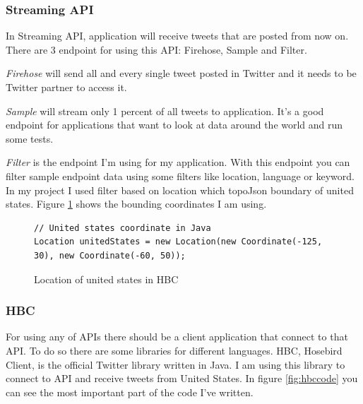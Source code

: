 \documentclass[a4paper,11pt]{report}
\begin{document}
\subsubsection{Streaming API}

In Streaming API, application will receive tweets that are posted from now on. There are 3 endpoint for using this API: Firehose, Sample and Filter.

\emph{Firehose} will send all and every single tweet posted in Twitter and it needs to be Twitter partner to access it.

\emph{Sample} will stream only 1 percent of all tweets to application. It's a good endpoint for applications that want to look at data around the world and run some tests.

\emph{Filter} is the endpoint I'm using for my application. With this endpoint you can filter sample endpoint data using some filters like location, language or keyword. In my project I used filter based on location which topoJson boundary of united states. Figure \ref{fig:hbcus} shows the bounding coordinates I am using.

\begin{figure}[!hbp]
\caption{Location of united states in HBC}
\begin{lstlisting}
// United states coordinate in Java
Location unitedStates = new Location(new Coordinate(-125, 30), new Coordinate(-60, 50));
\end{lstlisting}
\label{fig:hbcus}
\end{figure}

\subsubsection{HBC}
For using any of APIs there should be a client application that connect to that API. To do so there are some libraries for different languages. HBC, Hosebird Client, is the official Twitter library written in Java. I am using this library to connect to API and receive tweets from United States. In figure \ref{fig:hbccode} you can see the most important part of the code I've written.
\end{document}
